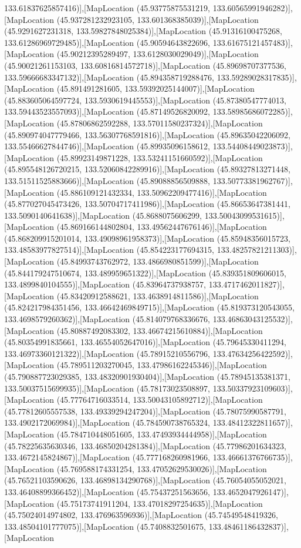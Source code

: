133.61837625857416)],[MapLocation (45.93775875531219, 133.60565991946282)],[MapLocation (45.937281232923105, 133.601368385039)],[MapLocation (45.9291627231318, 133.59827848025384)],[MapLocation (45.91316100475268, 133.61286969729485)],[MapLocation (45.90594643822696, 133.61675121457483)],[MapLocation (45.90212395289497, 133.6128030029049)],[MapLocation (45.90021261153103, 133.60816814572718)],[MapLocation (45.89698707377536, 133.59666683347132)],[MapLocation (45.894358719288476, 133.59289028317835)],[MapLocation (45.891491281605, 133.59392025144007)],[MapLocation (45.883605064597724, 133.5930619445553)],[MapLocation (45.87380547774013, 133.59443523557093)],[MapLocation (45.87149526820092, 133.58985686072285)],[MapLocation (45.87806862592288, 133.57011580237324)],[MapLocation (45.890974047779466, 133.56307768591816)],[MapLocation (45.89635042206092, 133.55466627844746)],[MapLocation (45.89935096158612, 133.54408449023873)],[MapLocation (45.89923149871228, 133.53241151660592)],[MapLocation (45.895548126720215, 133.52060842289916)],[MapLocation (45.89327813271448, 133.51511525883666)],[MapLocation (45.89088856509888, 133.50773381962767)],[MapLocation (45.886109121432334, 133.50962209477416)],[MapLocation (45.877027045473426, 133.50704717411986)],[MapLocation (45.86653647381441, 133.5090140641638)],[MapLocation (45.8688075606299, 133.50043099531615)],[MapLocation (45.869166144802804, 133.49562447676146)],[MapLocation (45.868209915201014, 133.49098961958373)],[MapLocation (45.85948356015723, 133.48583977827514)],[MapLocation (45.854223177694315, 133.48257821211303)],[MapLocation (45.84993743762972, 133.4866980851599)],[MapLocation (45.844179247510674, 133.489959651322)],[MapLocation (45.839351809606015, 133.4899840104555)],[MapLocation (45.83964737938757, 133.4717462011827)],[MapLocation (45.83420912588621, 133.4638914811586)],[MapLocation (45.824217984351456, 133.46642469849715)],[MapLocation (45.819373120543055, 133.4698579260362)],[MapLocation (45.814079768336676, 133.46863043125532)],[MapLocation (45.80887492083302, 133.46674215610884)],[MapLocation (45.80354991835661, 133.46554052647016)],[MapLocation (45.79645330411294, 133.46973360121322)],[MapLocation (45.78915210556796, 133.47634256422592)],[MapLocation (45.789511203270045, 133.47986162245346)],[MapLocation (45.790887723029385, 133.48320901930404)],[MapLocation (45.78945135381371, 133.50037515699935)],[MapLocation (45.78173023508897, 133.50337923109603)],[MapLocation (45.77764716033514, 133.50043105892712)],[MapLocation (45.77812605557538, 133.49339294247204)],[MapLocation (45.78075990587791, 133.4902172069984)],[MapLocation (45.784590738765324, 133.48412322811657)],[MapLocation (45.784710448051605, 133.47493934444958)],[MapLocation (45.78225635630346, 133.46850204281384)],[MapLocation (45.77986201634323, 133.4672145824867)],[MapLocation (45.777168260981966, 133.46661376766735)],[MapLocation (45.769588174331254, 133.47052629530026)],[MapLocation (45.76521103590626, 133.46898134290768)],[MapLocation (45.76054055052021, 133.46408899366452)],[MapLocation (45.75437251563656, 133.4652047926147)],[MapLocation (45.75173741911204, 133.47018297254635)],[MapLocation (45.75024014974802, 133.476963596936)],[MapLocation (45.74549548419326, 133.48504101777075)],[MapLocation (45.7408832501675, 133.48461186432837)],[MapLocation 
